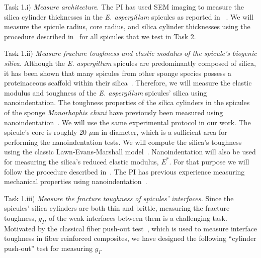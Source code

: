 \documentclass[10pt,letterpaper]{article}
\begin{document}
      {\selectfont Task 1.i}) \textit{Measure architecture}.
        The PI has used SEM imaging to measure the silica cylinder thicknesses in the \textit{E. aspergillum} spicules as reported in ~\cite{monn2015new}.
        We will measure the spicule radius, core radius, and silica cylinder thicknesses using the procedure described in~\cite{monn2015new} for all spicules that we test in Task 2.

      {\selectfont Task 1.ii}) \textit{Measure fracture toughness and elastic modulus of the spicule's biogenic silica.}
        Although the \textit{E. aspergillum} spicules are predominantly composed of silica, it has been shown that many spicules from other sponge species  possess a proteinaceous scaffold within their silica~\cite{wang2010morphology, weaver2003nanostructural}.
        Therefore, we will measure the elastic modulus and toughness of the \textit{E. aspergillum} spicules' silica using nanoindentation. The toughness properties of the silica cylinders in the spicules of the sponge \textit{Monorhaphis chuni} have previously been measured using nanoindentation~\cite{woesz2006micromechanical, Miserez:2008wf}. We will use the same experimental protocol in our work.
        The spicule's core is roughly 20 $\mu$m in diameter, which is a sufficient area for performing the nanoindentation tests. We will compute the silica's toughness using the classic Lawn-Evans-Marshall model~\cite{lawn1975indentation, evans1976fracture}. Nanoindentation will also be used for measuring the silica's reduced elastic modulus, $E^*$. For that purpose we will follow the procedure described in~\cite{oliver1992improved}. The PI has previous experience measuring mechanical properties using nanoindentation~\cite{kesari2010role, kesari2011mechanics}.

      {\selectfont Task 1.iii}) \textit{Measure the fracture toughness of spicules' interfaces.}
        Since the spicules' silica cylinders are both thin and brittle, measuring the fracture toughness, $g_{I}$, of the weak interfaces between them is a challenging task. Motivated by the classical fiber push-out test~\cite{marshall1984indentation}, which is used to measure interface toughness in fiber reinforced composites, we have designed the following ``cylinder push-out'' test for measuring $g_{I}$.
\end{document}
